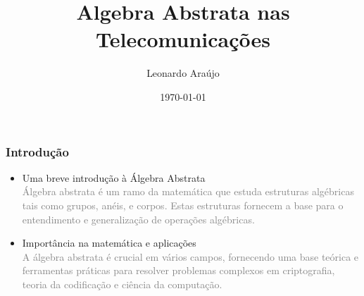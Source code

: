 \documentclass[portuguese,aspectratio=169]{beamer}
\title{Algebra Abstrata nas Telecomunicações}
\author{Leonardo Araújo}
\date{\today}
\begin{document}
\frame{\titlepage}

\begin{frame}
\frametitle{Introdução}
\begin{itemize}
    \item Uma breve introdução à Álgebra Abstrata\\
    \textcolor{gray}{Álgebra abstrata é um ramo da matemática que estuda estruturas algébricas tais como \textcolor[gray]{0.2}{grupos, anéis, e corpos}. 
    Estas estruturas fornecem a base para o entendimento e generalização de operações algébricas.}
    \item Importância na matemática e aplicações\\
    \textcolor{gray}{A álgebra abstrata é crucial em vários campos, fornecendo uma base teórica e ferramentas práticas para resolver problemas complexos em
    \textcolor[gray]{0.2}{criptografia, teoria da codificação e ciência da computação}.}
\end{itemize}
\end{frame}
\end{document}
